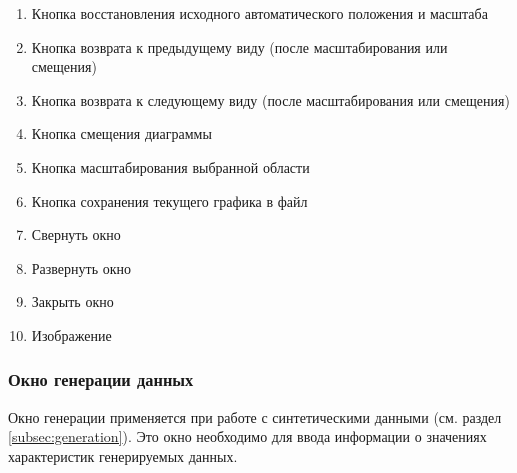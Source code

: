 \documentclass[12pt,tikz]{instruction}
\begin{document}
\begin{enumerate}
	\item Кнопка восстановления исходного автоматического положения и масштаба
	\item Кнопка возврата к предыдущему виду (после масштабирования или смещения)
	\item Кнопка возврата к следующему виду (после масштабирования или смещения)
	\item Кнопка смещения диаграммы
	\item Кнопка масштабирования выбранной области
	\item Кнопка сохранения текущего графика в файл
	\item Свернуть окно
	\item Развернуть окно
	\item Закрыть окно 
	\item Изображение
\end{enumerate}

\subsubsection{Окно генерации данных}
Окно генерации применяется при работе с синтетическими данными (см. раздел \ref{subsec:generation}). Это окно необходимо для ввода информации о значениях характеристик генерируемых данных.
\end{document}
